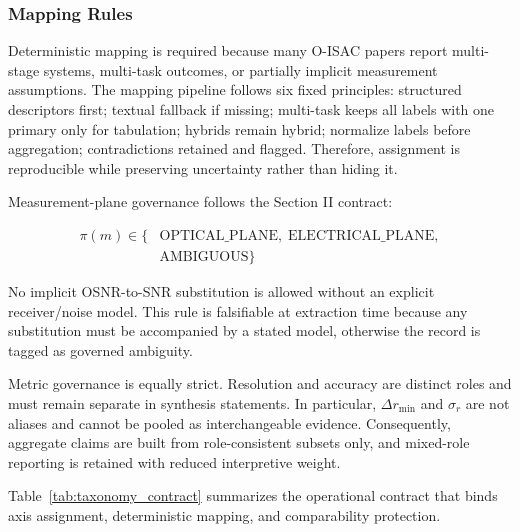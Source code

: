 \documentclass[lettersize,journal]{IEEEtran}
\begin{document}
\subsubsection{Mapping Rules}
Deterministic mapping is required because many O-ISAC papers report multi-stage systems, multi-task outcomes, or partially implicit measurement assumptions. The mapping pipeline follows six fixed principles: structured descriptors first; textual fallback if missing; multi-task keeps all labels with one primary only for tabulation; hybrids remain hybrid; normalize labels before aggregation; contradictions retained and flagged. Therefore, assignment is reproducible while preserving uncertainty rather than hiding it.

Measurement-plane governance follows the Section II contract:

\begin{equation}
\begin{aligned}
\pi(m)\in\{&\text{OPTICAL\_PLANE},\;\text{ELECTRICAL\_PLANE},\\
&\text{AMBIGUOUS}\}
\end{aligned}
\end{equation}


No implicit OSNR-to-SNR substitution is allowed without an explicit receiver/noise model. This rule is falsifiable at extraction time because any substitution must be accompanied by a stated model, otherwise the record is tagged as governed ambiguity.

Metric governance is equally strict. Resolution and accuracy are distinct roles and must remain separate in synthesis statements. In particular, $\Delta r_{\min}$ and $\sigma_r$ are not aliases and cannot be pooled as interchangeable evidence. Consequently, aggregate claims are built from role-consistent subsets only, and mixed-role reporting is retained with reduced interpretive weight.

Table~\ref{tab:taxonomy_contract} summarizes the operational contract that binds axis assignment, deterministic mapping, and comparability protection.
\end{document}
